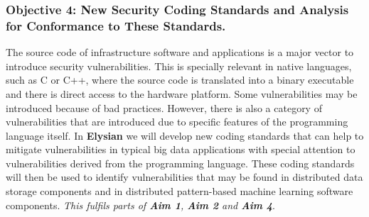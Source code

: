 \documentclass[a4paper,11pt]{article}
\newcommand{\project}[1]{\textbf{#1}\xspace}
\newcommand{\SECURITY}{\project{Elysian}}
\newcommand{\TheProject}{\SECURITY}
\begin{document}

\subsubsection*{Objective 4: New Security Coding Standards and Analysis for Conformance to These Standards.}
The source code of infrastructure software and applications is a major vector to introduce security vulnerabilities. This is specially relevant in native languages, such as C or C++, where the source code is translated into a binary executable and there is direct access to the hardware platform. Some vulnerabilities may be introduced because of bad practices. However, there is also a category of vulnerabilities that are introduced due to specific features of the programming language itself.
In \TheProject{} we will develop new coding standards that can help to mitigate vulnerabilities in typical big data applications with special attention to vulnerabilities derived from  the programming language. %
These coding standards will then be used to identify vulnerabilities that may be found in distributed data storage components and in distributed pattern-based machine learning software components. \emph{This fulfils parts of \textbf{Aim 1}, \textbf{Aim 2} and \textbf{Aim 4}}.
\end{document}
